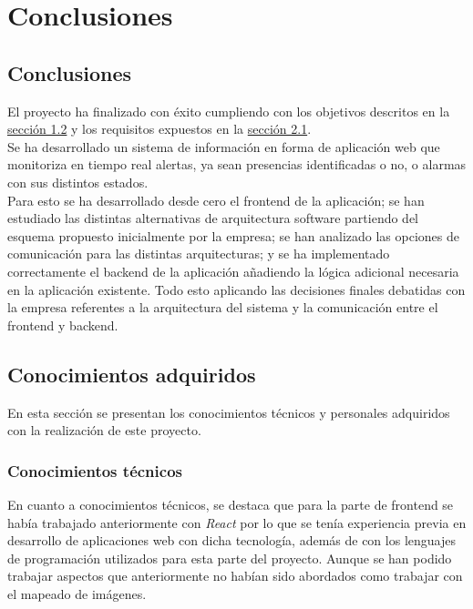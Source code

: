 \chapter{Conclusiones}

\section{Conclusiones}


El proyecto ha finalizado con éxito cumpliendo con los objetivos descritos en la \hyperref[section-objetivos]{sección 1.2} y los requisitos expuestos en la \hyperref[section-requisitos]{sección 2.1}.\\

Se ha desarrollado un sistema de información en forma de aplicación web que monitoriza en tiempo real alertas, ya sean presencias identificadas o no, o alarmas con sus distintos estados.\\

Para esto se ha desarrollado desde cero el frontend de la aplicación; se han estudiado las distintas alternativas de arquitectura software partiendo del esquema propuesto inicialmente por la empresa; se han analizado las opciones de comunicación para las distintas arquitecturas; y se ha implementado correctamente el backend de la aplicación añadiendo la lógica adicional necesaria en la aplicación existente. Todo esto aplicando las decisiones finales debatidas con la empresa referentes a la arquitectura del sistema y la comunicación entre el frontend y backend.
 

\section{Conocimientos adquiridos}

En esta sección se presentan los conocimientos técnicos y personales adquiridos con la realización de este proyecto.

\subsection{Conocimientos técnicos}


En cuanto a conocimientos técnicos, se destaca que para la parte de frontend se había trabajado anteriormente con \textit{React} por lo que se tenía experiencia previa en desarrollo de aplicaciones web con dicha tecnología, además de con los lenguajes de programación utilizados para esta parte del proyecto. Aunque se han podido trabajar aspectos que anteriormente no habían sido abordados como trabajar con el mapeado de imágenes. \\

